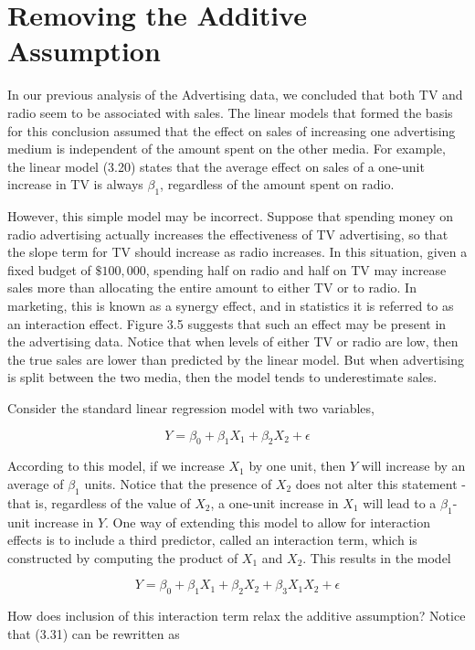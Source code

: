 \documentclass[10pt]{article}
\begin{document}
\section*{Removing the Additive Assumption}
In our previous analysis of the Advertising data, we concluded that both TV and radio seem to be associated with sales. The linear models that formed the basis for this conclusion assumed that the effect on sales of increasing one advertising medium is independent of the amount spent on the other media. For example, the linear model (3.20) states that the average effect on sales of a one-unit increase in TV is always $\beta_{1}$, regardless of the amount spent on radio.

However, this simple model may be incorrect. Suppose that spending money on radio advertising actually increases the effectiveness of TV advertising, so that the slope term for TV should increase as radio increases. In this situation, given a fixed budget of $\$ 100,000$, spending half on radio and half on TV may increase sales more than allocating the entire amount to either TV or to radio. In marketing, this is known as a synergy effect, and in statistics it is referred to as an interaction effect. Figure 3.5 suggests that such an effect may be present in the advertising data. Notice that when levels of either TV or radio are low, then the true sales are lower than predicted by the linear model. But when advertising is split between the two media, then the model tends to underestimate sales.

Consider the standard linear regression model with two variables,

$$
Y=\beta_{0}+\beta_{1} X_{1}+\beta_{2} X_{2}+\epsilon
$$

According to this model, if we increase $X_{1}$ by one unit, then $Y$ will increase by an average of $\beta_{1}$ units. Notice that the presence of $X_{2}$ does not alter this statement - that is, regardless of the value of $X_{2}$, a one-unit increase in $X_{1}$ will lead to a $\beta_{1}$-unit increase in $Y$. One way of extending this model to allow for interaction effects is to include a third predictor, called an interaction term, which is constructed by computing the product of $X_{1}$ and $X_{2}$. This results in the model


\begin{equation*}
Y=\beta_{0}+\beta_{1} X_{1}+\beta_{2} X_{2}+\beta_{3} X_{1} X_{2}+\epsilon \tag{3.31}
\end{equation*}


How does inclusion of this interaction term relax the additive assumption? Notice that (3.31) can be rewritten as
\end{document}
